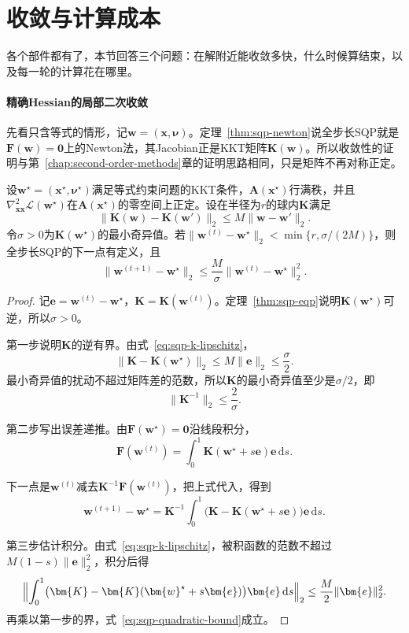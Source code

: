 \section{收敛与计算成本}
\label{sec:sqp-convergence}

各个部件都有了，本节回答三个问题：在解附近能收敛多快，什么时候算结束，以及每一轮的计算花在哪里。

\paragraph{精确Hessian的局部二次收敛}
先看只含等式的情形，记$\bm{w}=(\bm{x},\bm{\nu})$。定理~\ref{thm:sqp-newton}说全步长SQP就是$\bm{F}(\bm{w})=\bm{0}$上的Newton法，其Jacobian正是KKT矩阵$\bm{K}(\bm{w})$。所以收敛性的证明与第~\ref{chap:second-order-methods}章的证明思路相同，只是矩阵不再对称正定。

\begin{theorem}[SQP的局部二次收敛]
\label{thm:sqp-local-quadratic}
设$\bm{w}^\star=(\bm{x}^\star,\bm{\nu}^\star)$满足等式约束问题的KKT条件，$\bm{A}(\bm{x}^\star)$行满秩，并且$\nabla^2_{\bm{x}\bm{x}}\mathcal{L}(\bm{w}^\star)$在$\bm{A}(\bm{x}^\star)$的零空间上正定。设在半径为$r$的球内$\bm{K}$满足
\begin{equation}
 \lVert\bm{K}(\bm{w})-\bm{K}(\bm{w}')\rVert_2\leq M\lVert\bm{w}-\bm{w}'\rVert_2.
 \label{eq:sqp-k-lipschitz}
\end{equation}
令$\sigma>0$为$\bm{K}(\bm{w}^\star)$的最小奇异值。若$\lVert\bm{w}^{(t)}-\bm{w}^\star\rVert_2<\min\{r,\sigma/(2M)\}$，则全步长SQP的下一点有定义，且
\begin{equation}
 \lVert\bm{w}^{(t+1)}-\bm{w}^\star\rVert_2\leq\frac{M}{\sigma}\lVert\bm{w}^{(t)}-\bm{w}^\star\rVert_2^2.
 \label{eq:sqp-quadratic-bound}
\end{equation}
\end{theorem}

\begin{proof}
记$\bm{e}=\bm{w}^{(t)}-\bm{w}^\star$，$\bm{K}=\bm{K}(\bm{w}^{(t)})$。定理~\ref{thm:sqp-eqp}说明$\bm{K}(\bm{w}^\star)$可逆，所以$\sigma>0$。

第一步说明$\bm{K}$的逆有界。由式~\eqref{eq:sqp-k-lipschitz}，
\[
 \lVert\bm{K}-\bm{K}(\bm{w}^\star)\rVert_2\leq M\lVert\bm{e}\rVert_2\leq\frac\sigma2.
\]
最小奇异值的扰动不超过矩阵差的范数，所以$\bm{K}$的最小奇异值至少是$\sigma/2$，即
\[
 \lVert\bm{K}^{-1}\rVert_2\leq\frac2\sigma.
\]

第二步写出误差递推。由$\bm{F}(\bm{w}^\star)=\bm{0}$沿线段积分，
\[
 \bm{F}(\bm{w}^{(t)})=\int_0^1\bm{K}(\bm{w}^\star+s\bm{e})\bm{e}\,\mathrm{d}s.
\]

下一点是$\bm{w}^{(t)}$减去$\bm{K}^{-1}\bm{F}(\bm{w}^{(t)})$，把上式代入，得到
\[
 \bm{w}^{(t+1)}-\bm{w}^\star
 =\bm{K}^{-1}\int_0^1\bigl(\bm{K}-\bm{K}(\bm{w}^\star+s\bm{e})\bigr)\bm{e}\,\mathrm{d}s.
\]

第三步估计积分。由式~\eqref{eq:sqp-k-lipschitz}，被积函数的范数不超过$M(1-s)\lVert\bm{e}\rVert_2^2$，积分后得
\[
 \Bigl\lVert\int_0^1\bigl(\bm{K}-\bm{K}(\bm{w}^\star+s\bm{e})\bigr)\bm{e}\,\mathrm{d}s\Bigr\rVert_2\leq\frac M2\lVert\bm{e}\rVert_2^2.
\]
再乘以第一步的界，式~\eqref{eq:sqp-quadratic-bound}成立。
\end{proof}

